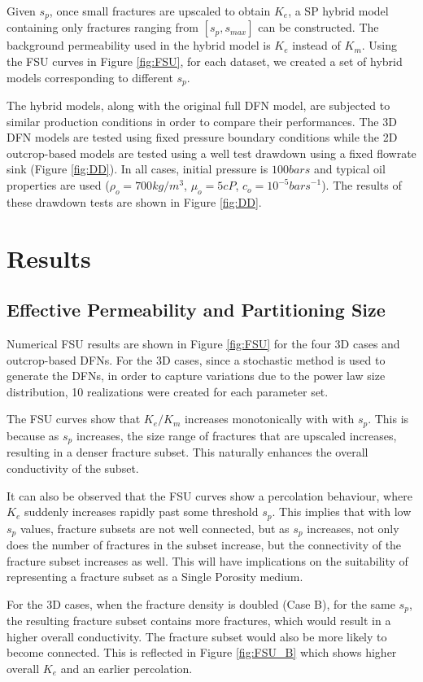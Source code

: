 \documentclass[a4paper]{article}
\begin{document}
Given $s_p$, once small fractures are upscaled to obtain $K_e$, a SP hybrid model containing only fractures ranging from $[s_p,s_{max}]$ can be constructed. The background permeability used in the hybrid model is $K_e$ instead of $K_m$. Using the FSU curves in Figure \ref{fig:FSU}, for each dataset, we created a set of hybrid models corresponding to different $s_p$. 

The hybrid models, along with the original full DFN model, are subjected to similar production conditions in order to compare their performances. The 3D DFN models are tested using fixed pressure boundary conditions while the 2D outcrop-based models are tested using a well test drawdown using a fixed flowrate sink (Figure \ref{fig:DD}). In all cases, initial pressure is $100 bars$ and typical oil properties are used ($\rho_o=700 kg/m^3$, $\mu_o=5 cP$, $c_o=10^{-5} {bars}^{-1}$). The results of these drawdown tests are shown in Figure \ref{fig:DD}.

\section{Results}
\subsection{Effective Permeability and Partitioning Size}
Numerical FSU results are shown in Figure \ref{fig:FSU} for the four 3D cases and outcrop-based DFNs. For the 3D cases, since a stochastic method is used to generate the DFNs, in order to capture variations due to the power law size distribution, 10 realizations were created for each parameter set. 

The FSU curves show that $K_e/K_m$ increases monotonically with with $s_p$. This is because as $s_p$ increases, the size range of fractures that are upscaled increases, resulting in a denser fracture subset. This naturally enhances the overall conductivity of the subset.

It can also be observed that the FSU curves show a percolation behaviour, where $K_e$ suddenly increases rapidly past some threshold $s_p$. This implies that with low $s_p$ values, fracture subsets are not well connected, but as $s_p$ increases, not only does the number of fractures in the subset increase, but the connectivity of the fracture subset increases as well. This will have implications on the suitability of representing a fracture subset as a Single Porosity medium.

For the 3D cases, when the fracture density is doubled (Case B), for the same $s_p$, the resulting fracture subset contains more fractures, which would result in a higher overall conductivity. The fracture subset would also be more likely to become connected. This is reflected in Figure \ref{fig:FSU_B} which shows higher overall $K_e$ and an earlier percolation.
\end{document}
